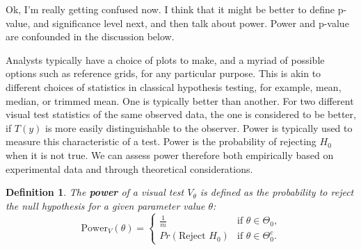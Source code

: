 \documentclass{article}
\newcommand{\green}[1]{{\color{green} #1}} %
\newtheorem{dfn}{Definition}[section]
\begin{document}


\green{Ok, I'm really getting confused now. I think that it might be better to define p-value, and significance level next, and then talk about power. Power and p-value are confounded in the discussion below.}

\noindent 
Analysts typically have a choice of plots to make, and a myriad of possible options such as reference grids, for any particular purpose. This is akin to different choices of statistics in classical hypothesis testing, for example, mean, median, or trimmed mean. One is typically better than another. For two different visual test statistics of the same observed data, the one is considered to be better, if $T(y)$ is more easily distinguishable to the observer. Power is typically used to measure this characteristic of a test. Power is the probability of rejecting $H_0$ when it is not true.  We can assess power therefore both empirically based on experimental data and through theoretical considerations. 


\begin{dfn} \label{dfn:power}
The \textbf{power} of a visual test $V_{\theta}$ is defined as the probability to reject the null hypothesis for a given parameter value $\theta$:
    \begin{equation*}
      \text{Power}_V(\theta)= 
        \begin{cases} 
              \frac1m & \text{if $\theta \in \Theta_0$,} \\
              Pr(\text{Reject } H_0) &\text{if $\theta \in \Theta^c_0$.}
        \end{cases}
    \end{equation*}
\end{dfn}
\end{document}
